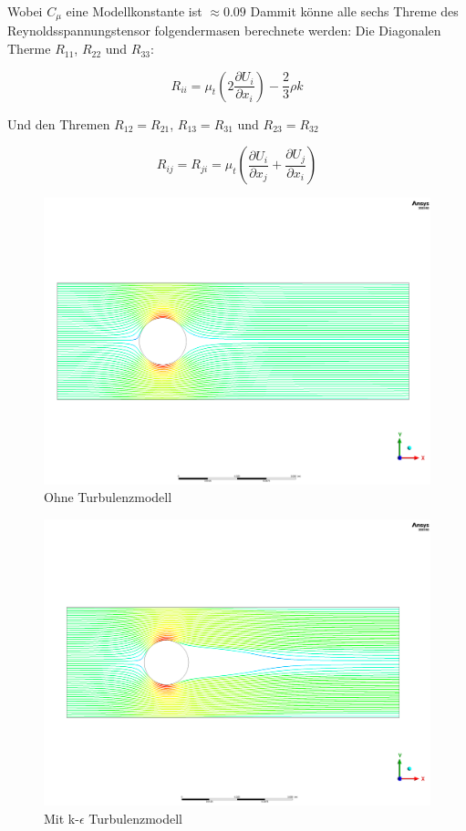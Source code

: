 \begin{refsection}
Wobei $C_\mu$ eine Modellkonstante ist $\approx 0.09$
Dammit könne alle sechs Threme des Reynoldsspannungstensor folgendermasen berechnete werden:
Die Diagonalen Therme $R_{11}$, $R_{22}$ und $R_{33}$:

\begin{equation}
    R_{ii} = \mu_t \left(2\frac{\partial U_i}{\partial x_i}\right) - \frac{2}{3}\rho k
\end{equation}

Und den Thremen $R_{12} = R_{21}$, $R_{13} = R_{31}$ und $R_{23} = R_{32}$

\begin{equation}
    R_{ij} = R_{ji} = \mu_t \left(\frac{\partial U_i}{\partial x_j} + \frac{\partial U_j}{\partial x_i}\right)
\end{equation}



\begin{figure}
    \includegraphics[width=\textwidth]{papers/reynolds/images/dns.png}
    \caption{Ohne Turbulenzmodell}
    \label{fig:DNS}
\end{figure}

\begin{figure}
    \includegraphics[width=\textwidth]{papers/reynolds/images/k-e.png}
    \caption{Mit k-$\epsilon$ Turbulenzmodell}
    \label{fig:k-e}
\end{figure}


\end{refsection}
